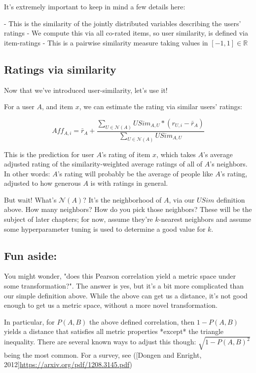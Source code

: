 It's extremely important to keep in mind a few details here:

- This is the similarity of the jointly distributed variables describing the users' ratings
- We compute this via all co-rated items, so user similarity, is defined via item-ratings
- This is a pairwise similarity measure taking values in $[-1,1]\in \mathbb{R}$

\subsection{Ratings via similarity}

Now that we've introduced user-similarity, let's use it!

For a user $A$, and item $x$, we can estimate the rating via similar users' ratings:

\begin{equation}
    Aff_{A,i}=\bar{r}_A+\frac{\sum_{U\in \mathcal{N}(A)}USim_{A,U}*(r_{U,i}-\bar{r}_A)}{\sum_{U\in \mathcal{N}(A)}USim_{A,U}}
\end{equation}

This is the prediction for user $A$'s rating of item $x$, which takes $A$'s average adjusted rating of the similarity-weighted average ratings of all of $A$'s neighbors. In other words: $A$'s rating will probably be the average of people like $A$'s rating, adjusted to how generous $A$ is with ratings in general.

But wait! What's $\mathcal{N}(A)$? It's the neighborhood of $A$, via our $USim$ definition above. How many neighbors? How do you pick those neighbors? These will be the subject of later chapters; for now, assume they're $k$-nearest neighbors and assume some hyperparameter tuning is used to determine a good value for $k$.

\subsection{Fun aside:}

You might wonder, "does this Pearson correlation yield a metric space under some transformation?". The answer is yes, but it's a bit more complicated than our simple definition above. While the above can get us a distance, it's not good enough to get us a metric space, without a more novel transformation.

In particular, for $P(A,B)$ the above defined correlation, then $1-P(A,B)$ yields a distance that satisfies all metric properties *except* the triangle inequality. There are several known ways to adjust this though: $\sqrt{1-P(A,B)^2}$ being the most common. For a survey, see ([Dongen and Enright, 2012]\url{https://arxiv.org/pdf/1208.3145.pdf})

